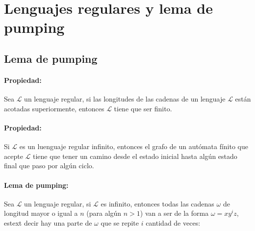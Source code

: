 \section{Lenguajes regulares y lema de pumping}
\label{sec:pumping}
\subsection{Lema de pumping}
\label{subsec:pumping}
\paragraph{Propiedad:} Sea \(\mathcal{L}\) un lenguaje regular, si las longitudes de las cadenas de un lenguaje \(\mathcal{L}\) están acotadas superiormente, entonces \(\mathcal{L}\) tiene que ser finito.

\paragraph{Propiedad:} Si \(\mathcal{L}\) es un luenguaje regular infinito, entonces el grafo de un autómata fínito que acepte \(\mathcal{L}\) tiene que tener un camino desde el estado inicial hasta algún estado final que paso por algún ciclo.

\paragraph{Lema de pumping:} Sea \(\mathcal{L}\) un lenguaje regular, si \(\mathcal{L}\) es infinito, entonces todas las cadenas \(\omega\) de longitud mayor o igual a \(n\) (para algún \(n > 1\)) van a ser de la forma \(\omega=xy^iz\), estext decir hay una parte de \(\omega\) que se repite \(i\) cantidad de veces:

